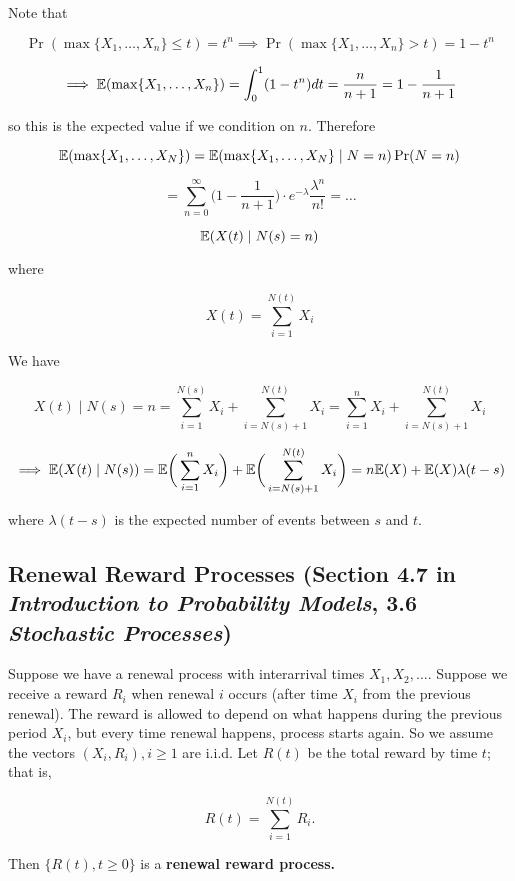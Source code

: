 \begin{solution} Note that 

\[
 \Pr(\max\{X_1, \ldots, X_n\} \leq t) = t^n \implies  \Pr(\max\{X_1, \ldots, X_n\} > t) = 1 - t^n
\]

\[
\implies \E(\max\{X_1, \ldots, X_n\}) = \int_0^1 (1 - t^n ) dt = \frac{n}{n+1} = 1 - \frac{1}{n+1}
\]

so this is the expected value if we condition on \(n\). Therefore

\[
\E( \max\{X_1, \ldots, X_N\}) = \E( \max\{X_1, \ldots, X_N\} \mid N = n) \Pr(N = n) 
\]

\[
=\sum_{n=0}^\infty  \bigg( 1 - \frac{1}{n+1} \bigg) \cdot e^{-\lambda} \frac{\lambda^n}{n!} = \ldots
\]

\end{solution}

\begin{exercise}

\[
\E(X(t) \mid N(s) = n)
\]

where

%

\[
X(t) = \sum_{i=1}^{N(t)} X_i
\]

\end{exercise}

\begin{solution}

We have

\[
X(t) \mid N(s) = n =   \sum_{i=1}^{N(s)} X_i  + \sum_{i=N(s) + 1}^{N(t)} X_i =   \sum_{i=1}^{n} X_i  + \sum_{i=N(s) + 1}^{N(t)} X_i
\]

\[
\implies \E(X(t) \mid N(s)) = \E \bigg(  \sum_{i=1}^{n} X_i  \bigg) + \E \bigg( \sum_{i=N(s) + 1}^{N(t)} X_i \bigg)  = n \E(X) + \E (X) \lambda(t-s)
\]

where \(\lambda(t-s)\) is the expected number of events between \(s\) and \(t\).

\end{solution}

\subsection{Renewal Reward Processes (Section 4.7 in \textit{Introduction to Probability Models}, 3.6 \textit{Stochastic Processes})}

\begin{definition}Suppose we have a renewal process with interarrival times \(X_1, X_2, \ldots\). Suppose we receive a reward \(R_i\) when renewal \(i\) occurs (after time \(X_i\) from the previous renewal). The reward is allowed to depend on what happens during the previous period \(X_i\), but every time renewal happens, process starts again. So we assume the vectors \((X_i, R_i), i \geq 1\) are i.i.d. Let \(R(t)\) be the total reward by time \(t\); that is,

\[
R(t) = \sum_{i=1}^{N(t)} R_i.
\]

Then \(\{R(t), t \geq 0\}\) is a \textbf{renewal reward process.}

\end{definition}

